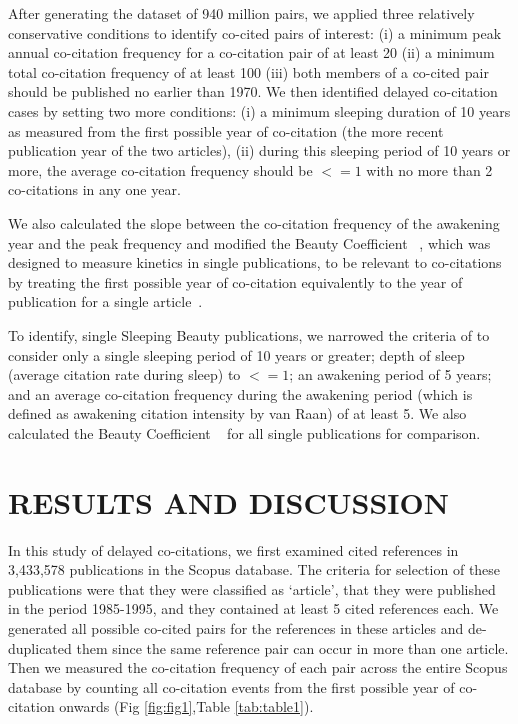 \documentclass[utf8]{frontiersSCNS}
\begin{document}
After generating the dataset of 940 million pairs, we applied three relatively conservative conditions to identify co-cited pairs of interest: (i) a minimum peak annual co-citation frequency for a co-citation pair of at least 20 (ii) a minimum total co-citation frequency of at least 100 (iii) both members of a co-cited pair should be published no earlier than 1970. We then identified delayed co-citation cases by setting two more conditions: (i) a minimum sleeping duration of 10 years as measured from the first possible year of co-citation (the more recent publication year of the two articles), (ii) during this sleeping period of 10 years or more, the average co-citation frequency should be $<= 1$ with no more than 2 co-citations in any one year. 

We also calculated the slope between the co-citation frequency of the awakening year and the peak frequency and modified the Beauty Coefficient ~\citep{Ke2015,devarakonda_2020}, which was designed to measure kinetics in single publications, to be relevant to co-citations by treating the first possible year of co-citation equivalently to the year of publication for a single article~\citep{devarakonda_2020}. 

To identify, single Sleeping Beauty publications, we narrowed the criteria of \cite{Raan2019} to consider only a single sleeping period of 10 years or greater; depth of sleep (average citation rate during sleep) to $<= 1$; an awakening period of 5 years; and an average co-citation frequency during the awakening period (which is defined as awakening citation intensity by van Raan) of at least 5. We also calculated the Beauty Coefficient ~\citep{Ke2015} for all single publications for comparison.

\section{RESULTS AND DISCUSSION}

In this study of delayed co-citations, we first examined cited references in 3,433,578 publications in the Scopus database. The criteria for selection of these publications were that they were classified as `article', that they were published in the period 1985-1995, and they contained at least 5 cited references each. We generated all possible co-cited pairs for the references in these articles and de-duplicated them since the same reference pair can occur in more than one article. Then we measured the co-citation frequency of each pair across the entire Scopus database by counting all co-citation events from the first possible year of co-citation onwards (Fig \ref{fig:fig1},Table \ref{tab:table1}).
\end{document}
